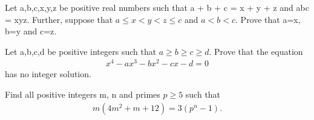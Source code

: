\item Let a,b,c,x,y,z be positive real numbers such that a + b + c = x + y + z and abc = xyz. Further, suppose that $a \leq x < y < z \leq c$ and $a < b < c$. Prove that a=x, b=y and c=z.

\item Let a,b,c,d be positive integers such that $a \geq b \geq c \geq d$. Prove that the equation 
\begin{align*}
x^{4} - ax^{3} - bx^{2} - cx - d = 0
\end{align*}
has no integer solution.

\item Find all positive integers m, n and primes $p \geq 5$ such that
\begin{align*}
m(4m^{2} + m + 12) = 3(p^{n} - 1).
\end{align*}













